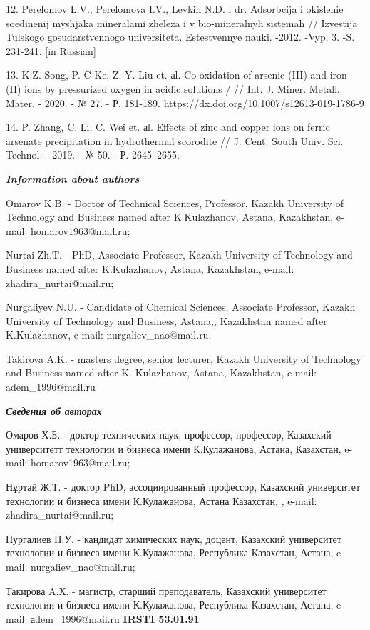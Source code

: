 12. Perelomov L.V., Perelomova I.V., Levkin N.D. i dr. Adsorbcija i
okislenie soedinenij mysh\textquotesingle jaka mineralami zheleza i v
bio-mineral\textquotesingle nyh sistemah // Izvestija
Tul\textquotesingle skogo gosudarstvennogo universiteta. Estestvennye
nauki. -2012. -Vyp. 3. -S. 231-241. {[}in Russian{]}

13. K.Z. Song, P. C Ke, Z. Y. Liu et. аl. Co-oxidation of arsenic (III)
and iron (II) ions by pressurized oxygen in acidic solutions / // Int.
J. Miner. Metall. Mater. - 2020. - № 27. - Р. 181-189.
https://dx.doi.org/10.1007/s12613-019-1786-9

14. P. Zhang, C. Li, C. Wei et. аl. Effects of zinc and copper ions on
ferric arsenate precipitation in hydrothermal scorodite // J. Cent.
South Univ. Sci. Technol. - 2019. - № 50. - Р. 2645--2655.

\emph{{\bfseries Information about authors}}

Omarov K.B. - Doctor of Technical Sciences, Professor, Kazakh University
of Technology and Business named after K.Kulazhanov, Astana, Kazakhstan,
e-mail: homarov1963@mail.ru;

Nurtai Zh.T. - PhD, Associate Professor, Kazakh University of Technology
and Business named after K.Kulazhanov, Astana, Kazakhstan, e-mail:
zhadira\_nurtai@mail.ru;

Nurgaliyev N.U. - Candidate of Chemical Sciences, Associate Professor,
Kazakh University of Technology and Business, Astana,, Kazakhstan named
after K.Kulazhanov, e-mail: nurgaliev\_nao@mail.ru;

Takirova A.K. - master\textquotesingle s degree, senior lecturer, Kazakh
University of Technology and Business named after K. Kulazhanov, Astana,
Kazakhstan, e-mail: adem\_1996@mail.ru

\emph{{\bfseries Сведения об авторах}}

Омаров Х.Б. - доктор технических наук, профессор, профессор, Казахский
университетт технологии и бизнеса имени К.Кулажанова, Астана, Казахстан,
e-mail: homarov1963@mail.ru;

Нұртай Ж.Т. - доктор PhD, ассоциированный профессор, Казахский
университет технологии и бизнеса имени К.Кулажанова, Астана Казахстан, ,
e-mail: zhadira\_nurtai@mail.ru;

Нургалиев Н.У. - кандидат химических наук, доцент, Казахский университет
технологии и бизнеса имени К.Кулажанова, Республика Казахстан, Астана,
e-mail: nurgaliev\_nao@mail.ru;

Такирова A.Х. - магистр, старший преподаватель, Казахский университет
технологии и бизнеса имени К.Кулажанова, Республика Казахстан, Астана,
e-mail: аdem\_1996@mail.ru\newpage
{\bfseries IRSTI 53.01.91}

